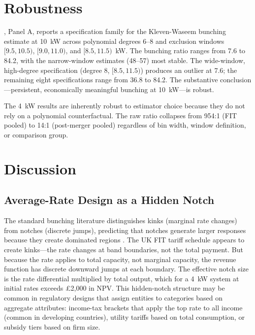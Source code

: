 \documentclass[12pt]{article}
\begin{document}
\section{Robustness}
\label{sec:robustness}

, Panel A, reports a specification family for the Kleven-Waseem bunching estimate at 10~kW across polynomial degrees 6--8 and exclusion windows $[9.5, 10.5)$, $[9.0, 11.0)$, and $[8.5, 11.5)$~kW. The bunching ratio ranges from 7.6 to 84.2, with the narrow-window estimates (48--57) most stable. The wide-window, high-degree specification (degree 8, $[8.5, 11.5)$) produces an outlier at 7.6; the remaining eight specifications range from 36.8 to 84.2. The substantive conclusion---persistent, economically meaningful bunching at 10~kW---is robust.

The 4~kW results are inherently robust to estimator choice because they do not rely on a polynomial counterfactual. The raw ratio collapses from 954:1 (FIT pooled) to 14:1 (post-merger pooled) regardless of bin width, window definition, or comparison group.




\section{Discussion}
\label{sec:discussion}

\subsection{Average-Rate Design as a Hidden Notch}

The standard bunching literature distinguishes kinks (marginal rate changes) from notches (discrete jumps), predicting that notches generate larger responses because they create dominated regions \citep{kleven2016bunching}. The UK FIT tariff schedule appears to create kinks---the rate changes at band boundaries, not the total payment. But because the rate applies to total capacity, not marginal capacity, the revenue function has discrete downward jumps at each boundary. The effective notch size is the rate differential multiplied by total output, which for a 4~kW system at initial rates exceeds \pounds 2,000 in NPV. This hidden-notch structure may be common in regulatory designs that assign entities to categories based on aggregate attributes: income-tax brackets that apply the top rate to all income (common in developing countries), utility tariffs based on total consumption, or subsidy tiers based on firm size.
\end{document}
